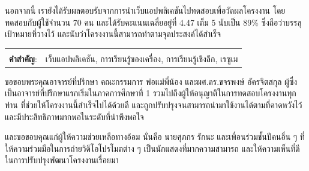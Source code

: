 \documentclass[12pt,oneside,openright,a4paper]{cpe-thai-project}
\begin{document}
นอกจากนี้ เรายังได้รับผลตอบรับจากการนำเว็บแอปพลิเคชันไปทดสอบเพื่อวัดผลโครงงาน โดยทดสอบกับผู้ใช้จำนวน 70 คน และได้รับคะแนนเฉลี่ยอยู่ที่ 4.47 เต็ม 5
นับเป็น 89\% ซึ่งถือว่าบรรลุเป้าหมายที่วางไว้ และนับว่าโครงงานนี้สามารถทำตามจุดประสงค์ได้สำเร็จ

\begin{flushleft}
    \begin{tabular*}{\textwidth}{@{}lp{}}
        & \\

        \textbf{คำสำคัญ}: & เว็บแอปพลิเคชัน, การเรียนรู้ของเครื่อง, การเรียนรู้เชิงลึก, เรซูเม
    \end{tabular*}
\end{flushleft}
\endabstract


\preface
ขอขอบพระคุณอาจารย์ที่ปรึกษา คณะกรรมการ พ่อแม่พี่น้อง และผศ.ดร.ขจรพงษ์ อัครจิตสกุล ผู้ซึ่งเป็นอาจารย์ที่ปรึกษาแรกเริ่มในภาคการศึกษาที่ 1
รวมไปถึงผู้ให้อนุญาติในการทดสอบโครงงานทุกท่าน
ที่ช่วยให้โครงงานนี้สำเร็จไปได้ด้วยดี และถูกปรับปรุงจนสามารถนำมาใช้งานได้ตามที่คาดหวังไว้ และมีประสิทธิภาพมากพอในระดับที่น่าพึงพอใจ

และขอขอบคุณแก่ผู้ให้ความช่วยเหลือทางอ้อม นั่นคือ นายศุภกร รักนะ และเพื่อนร่วมชั้นปีคนอื่น ๆ ที่ให้ความร่วมมือในการถ่ายวิดีโอโปรโมตต่าง ๆ เป็นนักแสดงที่มากความสามารถ
และให้ความเห็นที่ดีในการปรับปรุงพัฒนาโครงงานเรื่อยมา

\tableofcontents
\listoftables
\listoffigures
\end{document}
